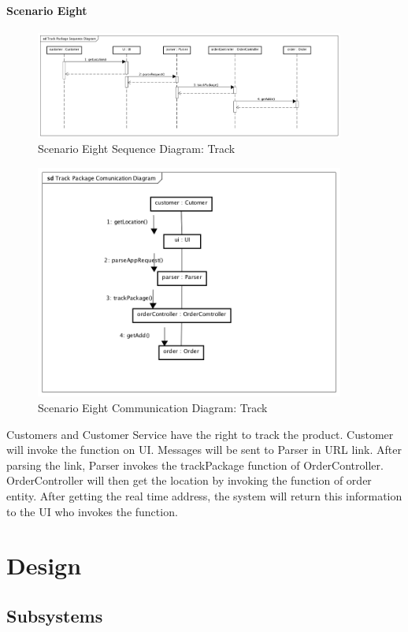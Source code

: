 \documentclass[12pt]{scrreprt}
\begin{document}
\subsubsection{Scenario Eight}
\begin{figure}[H]
  \centering\includegraphics[width=4in]{DocumentRes/8SequenceDiagram_track.png}
  \caption{Scenario Eight Sequence Diagram: Track}
\end{figure}
\begin{figure}[H]
  \centering\includegraphics[width=4in]{DocumentRes/8CommunicationDiagram_track.png}
  \caption{Scenario Eight Communication Diagram: Track}
\end{figure}
Customers and Customer Service have the right to track the product. Customer
will invoke the function on UI. Messages will be sent to Parser in
URL link. After parsing the link, Parser invokes the trackPackage
function of OrderController. OrderController will then get the location by
invoking the function of order entity. After getting the real time address,
the system will return this information to the UI who invokes the function.

\chapter{Design}
\section{Subsystems}
\end{document}
